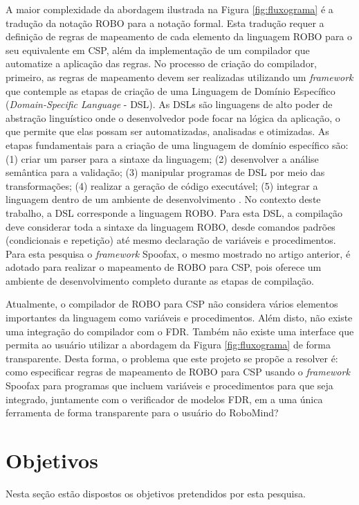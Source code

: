 A maior complexidade da abordagem ilustrada na Figura \ref{fig:fluxograma} é a tradução da notação ROBO para a notação formal. Esta tradução requer a definição de regras de mapeamento de cada elemento da linguagem ROBO para o seu equivalente em CSP, além da implementação de um compilador que automatize a aplicação das regras. No processo de criação do compilador, primeiro, as regras de mapeamento devem ser realizadas utilizando um \textit{framework} que contemple as etapas de criação de uma Linguagem de Domínio Específico (\textit{Domain-Specific Language} - DSL). As DSLs são linguagens de alto poder de abstração linguístico onde o desenvolvedor pode focar na lógica da aplicação, o que permite que elas possam ser automatizadas, analisadas e otimizadas. As etapas fundamentais para a criação de uma linguagem de domínio específico são: (1) criar um parser para a sintaxe da linguagem; (2) desenvolver a análise semântica para a validação; (3) manipular programas de DSL por meio das transformações; (4) realizar a geração de código executável; (5) integrar a linguagem dentro de um ambiente de desenvolvimento \cite{KatsSpoofax}. No contexto deste trabalho, a DSL corresponde a linguagem ROBO. Para esta DSL, a compilação deve considerar toda a sintaxe da linguagem ROBO, desde comandos padrões (condicionais e repetição) até mesmo declaração de variáveis e procedimentos. Para esta pesquisa o \textit{framework} Spoofax, o mesmo mostrado no artigo anterior, é adotado para realizar o mapeamento de ROBO para CSP, pois oferece um ambiente de desenvolvimento completo durante as etapas de compilação.

Atualmente, o compilador de ROBO para CSP não considera vários elementos importantes da linguagem como variáveis e procedimentos. Além disto, não existe uma integração do compilador com o FDR. Também não existe uma interface que permita ao usuário utilizar a abordagem da Figura \ref{fig:fluxograma} de forma transparente. Desta forma, o problema que este projeto se propõe a resolver é:
como especificar regras de mapeamento de ROBO para CSP usando o \textit{framework} Spoofax para programas que incluem variáveis e procedimentos para que seja integrado, juntamente com o verificador de modelos FDR, em a uma única ferramenta de forma transparente para o usuário do RoboMind?

\section{Objetivos}
Nesta seção estão dispostos os objetivos pretendidos por esta pesquisa.
